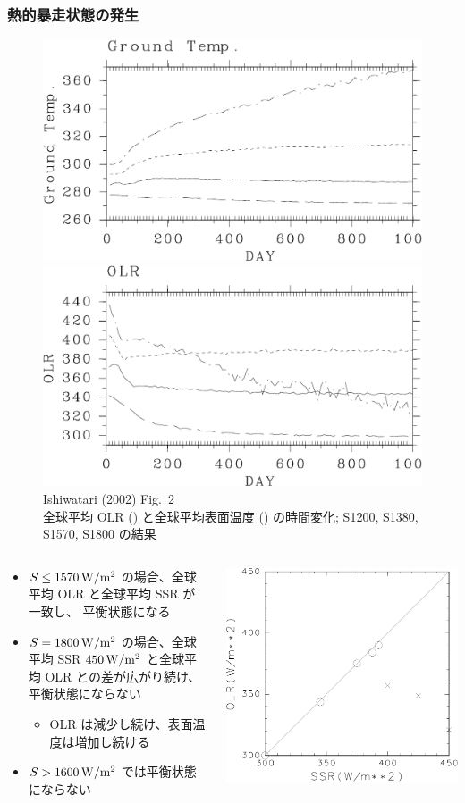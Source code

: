 \documentclass[aspectratio=149,9pt,fleqn]{beamer}
\begin{document}
\begin{frame}
	\frametitle{熱的暴走状態の発生}
	\begin{figure}
		\scriptsize
		\includegraphics[width=.45\textwidth]{./fig/Tg-seqs.kps-crop.pdf}
		\includegraphics[width=.45\textwidth]{./fig/OLR-seqs.kps-crop.pdf}\\
		Ishiwatari \etal (2002) Fig.~2\\
		全球平均 OLR () と全球平均表面温度 () の時間変化;
		S1200, S1380, S1570, S1800 の結果
	\end{figure}
	\begin{columns}[T,onlytextwidth]
		\begin{column}{.7\textwidth}
			\begin{itemize}
				\item \(S\leq1570\hmu{W/m^2}\) の場合、全球平均 OLR と全球平均 SSR が一致し、
					平衡状態になる
				\item \(S=1800\hmu{W/m^2}\) の場合、全球平均 SSR \(450\hmu{W/m^2}\) と全球平均
					OLR との差が広がり続け、平衡状態にならない
					\begin{itemize}
						\item OLR は減少し続け、表面温度は増加し続ける
					\end{itemize}
				\item \(S>1600\hmu{W/m^2}\) では平衡状態にならない
			\end{itemize}
		\end{column}
		\begin{column}{.3\textwidth}
			\centering\scriptsize
			\includegraphics[width=.7\textwidth]{./fig/ISR-OLR.kps-crop.pdf}\\

\end{column}
\end{columns}
\end{frame}
\end{document}
